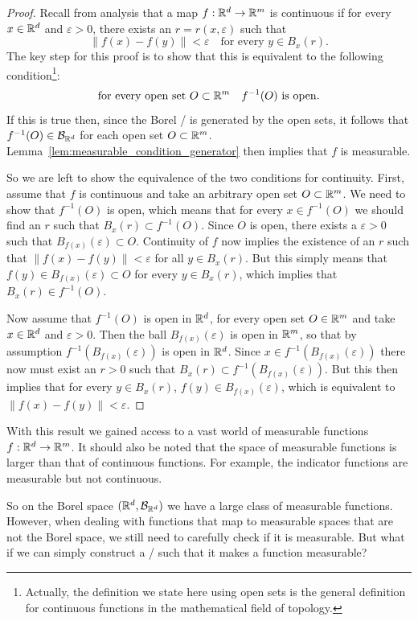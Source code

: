 \begin{proof}
Recall from analysis that a map $f : \mathbb R^d \to \mathbb R^m$ is continuous if for every $x \in \mathbb R^d$ and $\varepsilon > 0$, there exists an $r = r(x,\varepsilon)$ such that 
\[
	\|f(x) - f(y)\| < \varepsilon \quad \text{for every } y \in B_x(r).
\]
The key step for this proof is to show that this is equivalent to the following condition\footnote{Actually, the definition we state here using open sets is the general definition for continuous functions in the mathematical field of topology.}:
\[
	\text{for every open set } O \subset \mathbb R^m \quad f^{-1}(O) \text{ is open}.
\]
If this is true then, since the Borel \sigalg/ is generated by the open sets, it follows that $f^{-1}(O) \in \mathcal B_{\mathbb R^d}$ for each open set $O \subset \mathbb R^m$. Lemma~\ref{lem:measurable_condition_generator} then implies that $f$ is measurable.

So we are left to show the equivalence of the two conditions for continuity. First, assume that $f$ is continuous and take an arbitrary open set $O \subset \mathbb R^m$. We need to show that $f^{-1}(O)$ is open, which means that for every $x \in f^{-1}(O)$ we should find an $r$ such that $B_x(r) \subset f^{-1}(O)$. Since $O$ is open, there exists a $\varepsilon > 0$ such that $B_{f(x)}(\varepsilon) \subset O$. Continuity of $f$ now implies the existence of an $r$ such that $\|f(x) - f(y)\| < \varepsilon$ for all $y \in B_x(r)$. But this simply means that $f(y) \in B_{f(x)}(\varepsilon) \subset O$ for every $y \in B_x(r)$, which implies that $B_x(r) \in f^{-1}(O)$.

Now assume that $f^{-1}(O)$ is open in $\mathbb R^d$, for every open set $O \in \mathbb R^m$ and take $x \in \mathbb R^d$ and $\varepsilon > 0$. Then the ball $B_{f(x)}(\varepsilon)$ is open in $\mathbb R^m$, so that by assumption $f^{-1}(B_{f(x)}(\varepsilon))$ is open in $\mathbb R^d$. Since $x \in f^{-1}(B_{f(x)}(\varepsilon))$ there now must exist an $r > 0$ such that $B_x(r) \subset f^{-1}(B_{f(x)}(\varepsilon))$. But this then implies that for every $y \in B_x(r)$, $f(y) \in B_{f(x)}(\varepsilon)$, which is equivalent to $\|f(x) - f(y)\| < \varepsilon$.
\end{proof}

With this result we gained access to a vast world of measurable functions $f : \mathbb R^d \to \mathbb R^m$. It should also be noted that the space of measurable functions is larger than that of continuous functions. For example, the indicator functions are measurable but not continuous.

So on the Borel space $(\mathbb R^d, \mathcal B_{\mathbb R^d})$ we have a large class of measurable functions. However, when dealing with functions that map to measurable spaces that are not the Borel space, we still need to carefully check if it is measurable. But what if we can simply construct a \sigalg/ such that it makes a function measurable?

